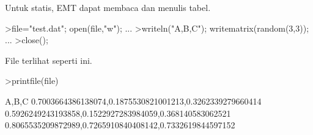 \documentclass[a4paper,10pt]{article}
\begin{document}
\begin{eulernotebook}
\begin{eulercomment}
\begin{eulercomment}
\begin{eulercomment}
\begin{eulercomment}
\begin{eulercomment}
\begin{eulercomment}
\begin{eulercomment}
Untuk statis, EMT dapat membaca dan menulis tabel.
\end{eulercomment}
\begin{eulerprompt}
>file="test.dat"; open(file,"w"); ...
>writeln("A,B,C"); writematrix(random(3,3)); ...
>close();
\end{eulerprompt}
\begin{eulercomment}
File terlihat seperti ini.
\end{eulercomment}
\begin{eulerprompt}
>printfile(file)
\end{eulerprompt}
\begin{euleroutput}
  A,B,C
  0.7003664386138074,0.1875530821001213,0.3262339279660414
  0.5926249243193858,0.1522927283984059,0.368140583062521
  0.8065535209872989,0.7265910840408142,0.7332619844597152
  

\end{euleroutput}
\end{eulercomment}
\end{eulercomment}
\end{eulercomment}
\end{eulercomment}
\end{eulercomment}
\end{eulercomment}
\end{eulernotebook}
\end{document}
